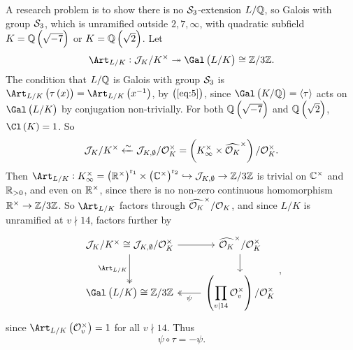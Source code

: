 A research problem is to show there is no $ \mathcal{S}_3 $-extension $ L / \mathbb{Q} $, so Galois with group $ \mathcal{S}_3 $, which is unramified outside $ 2, 7, \infty $, with quadratic subfield $ K = \QQ\br{\sqrt{-7}} $ or $ K = \QQ\br{\sqrt{2}} $. Let
$$ \Art_{L / K} : \JJJ_K / K^\times \twoheadrightarrow \Gal\br{L / K} \cong \ZZ / 3\ZZ. $$
The condition that $ L / \mathbb{Q} $ is Galois with group $ \mathcal{S}_3 $ is $ \Art_{L / K}\br{\tau\br{x}} = \Art_{L / K}\br{x^{-1}} $, by $ \br{\ref{eq:5}} $, since $ \Gal\br{K / \QQ} = \abr{\tau} $ acts on $ \Gal\br{L / K} $ by conjugation non-trivially. For both $ \QQ\br{\sqrt{-7}} $ and $ \QQ\br{\sqrt{2}} $, $ \Cl\br{K} = 1 $. So
$$ \JJJ_K / K^\times \xleftarrow{\sim} \JJJ_{K, \emptyset} / \OOO_K^\times = \br{K_\infty^\times \times \widehat{\OOO_K}^\times} / \OOO_K^\times. $$
Then $ \Art_{L / K} : K_\infty^\times = \br{\RR^\times}^{\r_1} \times \br{\CC^\times}^{\r_2} \hookrightarrow \JJJ_{K, \emptyset} \to \ZZ / 3\ZZ $ is trivial on $ \mathbb{C}^\times $ and $ \mathbb{R}_{> 0} $, and even on $ \mathbb{R}^\times $, since there is no non-zero continuous homomorphism $ \mathbb{R}^\times \to \mathbb{Z} / 3\mathbb{Z} $. So $ \Art_{L / K} $ factors through $ \widehat{\mathcal{O}_K}^\times / \mathcal{O}_K $, and since $ L / K $ is unramified at $ v \nmid 14 $, factors further by
$$
\begin{tikzcd}
\JJJ_K / K^\times \cong \JJJ_{K, \emptyset} / \OOO_K^\times \arrow{r} \arrow[twoheadrightarrow]{d}[swap]{\Art_{L / K}} & \widehat{\OOO_K}^\times / \OOO_K^\times \arrow{d} \\
\Gal\br{L / K} \cong \ZZ / 3\ZZ & \br{\displaystyle\prod_{v \mid 14} \OOO_v^\times} / \OOO_K^\times \arrow[twoheadrightarrow]{l}{\psi}
\end{tikzcd},
$$
since $ \Art_{L / K}\br{\OOO_v^\times} = 1 $ for all $ v \nmid 14 $. Thus
\begin{equation}
\label{eq:6}
\psi \circ \tau = -\psi.
\end{equation}
